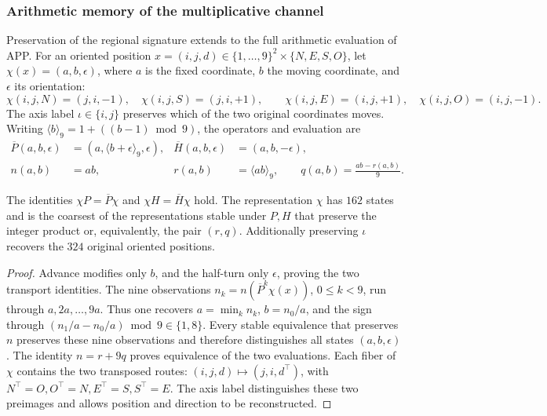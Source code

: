 \subsubsection{Arithmetic memory of the multiplicative channel}
\label{prd-arit:seccion}

Preservation of the regional signature extends to the full
arithmetic evaluation of APP. For an oriented position
\(x=(i,j,d)\in\{1,\ldots,9\}^2\times\{N,E,S,O\}\), let
\(\chi(x)=(a,b,\epsilon)\), where \(a\) is the fixed coordinate,
\(b\) the moving coordinate, and \(\epsilon\) its orientation:
\[
 \chi(i,j,N)=(j,i,-1),\quad \chi(i,j,S)=(j,i,+1),\qquad
 \chi(i,j,E)=(i,j,+1),\quad \chi(i,j,O)=(i,j,-1).
\]
The axis label \(\iota\in\{i,j\}\) preserves which of the
two original coordinates moves. Writing
\(\langle b\rangle_9=1+((b-1)\bmod9)\), the operators and
evaluation are
\begin{align}
 \overline P(a,b,\epsilon)&=(a,\langle b+\epsilon\rangle_9,\epsilon),
 &\overline H(a,b,\epsilon)&=(a,b,-\epsilon),\label{prd-arit:PH}\\
 n(a,b)&=ab,&r(a,b)&=\langle ab\rangle_9,\qquad
 q(a,b)=\frac{ab-r(a,b)}9.\label{prd-arit:rq}
\end{align}

\begin{proposition}
\label{prd-arit:minimal}
The identities \(\chi P=\overline P\chi\) and
\(\chi H=\overline H\chi\) hold. The representation \(\chi\)
has \(162\) states and is the coarsest of the representations
stable under \(P,H\) that preserve the integer product or,
equivalently, the pair \((r,q)\). Additionally preserving \(\iota\)
recovers the \(324\) original oriented positions.
\end{proposition}
\begin{proof}
Advance modifies only \(b\), and the half-turn only
\(\epsilon\), proving the two transport identities.
The nine observations \(n_k=n(\overline P^k\chi(x))\),
\(0\leq k<9\), run through \(a,2a,\ldots,9a\). Thus one recovers
\(a=\min_k n_k\), \(b=n_0/a\), and the sign through
\((n_1/a-n_0/a)\bmod9\in\{1,8\}\). Every stable equivalence
that preserves \(n\) preserves these nine observations and therefore
distinguishes all states \((a,b,\epsilon)\).
The identity \(n=r+9q\) proves equivalence of the two
evaluations. Each fiber of \(\chi\) contains the two transposed
routes: \((i,j,d)\mapsto(j,i,d^\top)\), with
\(N^\top=O,O^\top=N,E^\top=S,S^\top=E\). The axis label distinguishes
these two preimages and allows position and direction to be reconstructed.
\end{proof}

